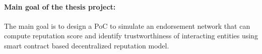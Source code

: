 \documentclass[a4paper,11pt,dvipsnames]{article}
\begin{document}
	\paragraph{Main goal of the thesis project:}
	The main goal is to design a PoC to simulate an endorsement network that 
	can compute reputation score and identify trustworthiness of interacting 
	entities using smart contract based decentralized reputation model. 


\end{document}
